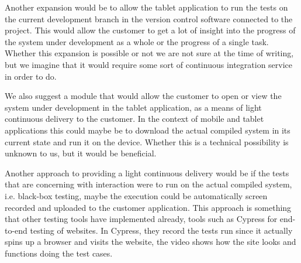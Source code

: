 Another expansion would be to allow the tablet application to run the tests on the current development branch in the version control software connected to the project.
This would allow the customer to get a lot of insight into the progress of the system under development as a whole or the progress of a single task.
Whether this expansion is possible or not we are not sure at the time of writing, but we imagine that it would require some sort of continuous integration service in order to do.

We also suggest a module that would allow the customer to open or view the system under development in the tablet application, as a means of light continuous delivery to the customer.
In the context of mobile and tablet applications this could maybe be to download the actual compiled system in its current state and run it on the device. 
Whether this is a technical possibility is unknown to us, but it would be beneficial.

Another approach to providing a light continuous delivery would be if the tests that are concerning with interaction were to run on the actual compiled system, i.e. black-box testing, maybe the execution could be automatically screen recorded and uploaded to the customer application.
This approach is something that other testing tools have implemented already, tools such as Cypress for end-to-end testing of websites.
In Cypress, they record the tests run since it actually spins up a browser and visits the website, the video shows how the site looks and functions doing the test cases.
